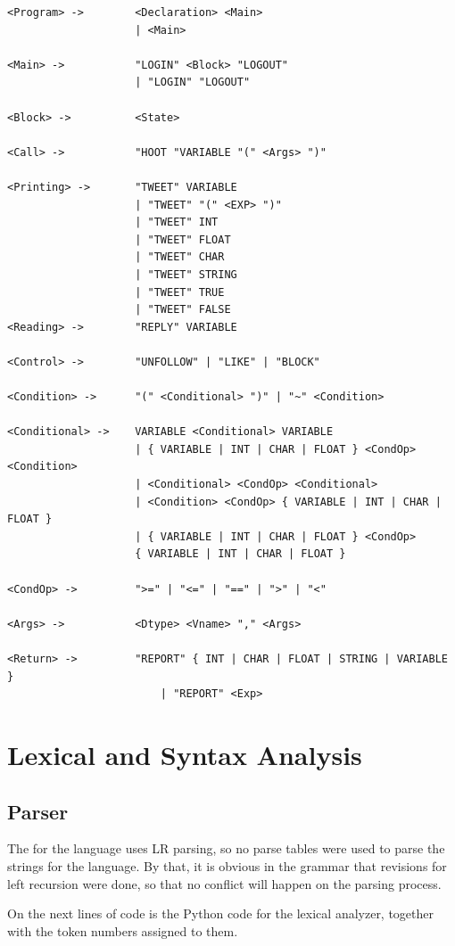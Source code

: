 \documentclass[11pt,a4paper]{report}
\begin{document}
\begin{lstlisting}
<Program> ->		<Declaration> <Main>
            		| <Main>
            
<Main> ->			"LOGIN" <Block> "LOGOUT"
          			| "LOGIN" "LOGOUT"
          			
<Block> ->			<State>

<Call> ->			"HOOT "VARIABLE "(" <Args> ")"

<Printing> -> 		"TWEET" VARIABLE
              		| "TWEET" "(" <EXP> ")"
              		| "TWEET" INT
              		| "TWEET" FLOAT
              		| "TWEET" CHAR
              		| "TWEET" STRING
              		| "TWEET" TRUE
              		| "TWEET" FALSE
<Reading> ->		"REPLY" VARIABLE

<Control> ->		"UNFOLLOW" | "LIKE" | "BLOCK"

<Condition> ->		"(" <Conditional> ")" | "~" <Condition>

<Conditional> ->	VARIABLE <Conditional> VARIABLE
          			| { VARIABLE | INT | CHAR | FLOAT } <CondOp> <Condition>
          			| <Conditional> <CondOp> <Conditional>
          			| <Condition> <CondOp> { VARIABLE | INT | CHAR | FLOAT }
          			| { VARIABLE | INT | CHAR | FLOAT } <CondOp>
          			{ VARIABLE | INT | CHAR | FLOAT }
          			
<CondOp> ->			">=" | "<=" | "==" | ">" | "<"

<Args> ->			<Dtype> <Vname> "," <Args>

<Return> ->			"REPORT" { INT | CHAR | FLOAT | STRING | VARIABLE }
						| "REPORT" <Exp>
\end{lstlisting}

\chapter{Lexical and Syntax Analysis}

\section{Parser}

The  for the language uses LR parsing, so no parse tables were
used to parse the strings for the language. By that, it is obvious in the grammar that
revisions for left recursion were done, so that no conflict will happen on the
parsing process. \par

On the next lines of code is the Python code for the lexical
analyzer, together with the token numbers
assigned to them.
\end{document}
